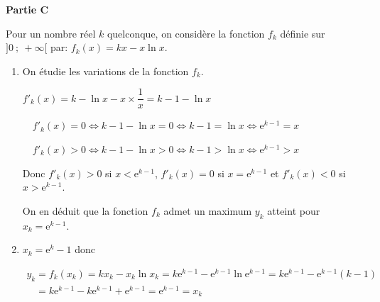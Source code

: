 \documentclass[10pt]{article}
\providecommand{\e}{{\mathrm{e}}}
\begin{document}
\bigskip

\textbf{Partie C}

\medskip

Pour un nombre réel $k$ quelconque, on considère la fonction $f_k$ définie sur $]0~;~+\infty[$ par:
$f_k(x) = kx - x \ln x.$

\begin{enumerate}
\item 

On étudie les variations de la fonction $f_k$.

$f'_k(x)=k - \ln x - x\times \dfrac{1}{x}= k-1 -\ln x$

\textbullet~~$f'_k(x) = 0 \iff k-1-\ln x = 0 \iff k-1 = \ln x \iff \e^{k-1}=x$

\textbullet~~$f'_k(x) > 0 \iff k-1-\ln x > 0 \iff k-1 > \ln x \iff \e^{k-1}>x$

Donc $f'_k(x)>0$ si $x<\e^{k-1}$, $f'_k(x)=0$ si $x=\e^{k-1}$ et $f'_k(x)<0$ si $x>\e^{k-1}$.

On en déduit que la fonction $f_k$ admet un maximum $y_k$ atteint pour $x_k=\e^{k-1}$.

\item  
$x_k = \e^k- 1$ donc 

$\begin{gathered}y_k=f_k(x_k) = kx_k - x_k \ln x_k
=k \e^{k- 1} -  \e^{k- 1}\ln \e^{k- 1}
= k\e^{k-1} - \e^{k- 1}\left (k-1\right )\\
\phantom{y_k}
=  k\e^{k-1} -  k\e^{k-1} +  \e^{k-1}
=\e^{k-1}
=x_k
\end{gathered}$


\end{enumerate}

\bigskip
\end{document}
